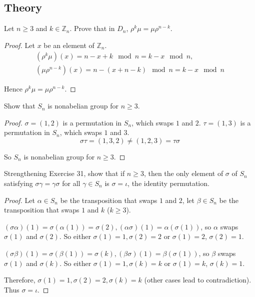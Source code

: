 \subsection*{Theory}

\newpage
\begin{exercise}
    Let $n\geq 3$ and $k\in\mathbb{Z}_{n}$. Prove that in $D_{n}$, $\rho^{k}\mu = \mu\rho^{n-k}$.
\end{exercise}

\begin{proof}
    Let $x$ be an element of $\mathbb{Z}_{n}$.
    \[
        \begin{split}
            (\rho^{k}\mu)(x) = n - x + k \mod n = k - x\mod n, \\
            (\mu\rho^{n-k})(x) = n - (x + n - k) \mod n = k - x \mod n
        \end{split}
    \]

    Hence $\rho^{k}\mu = \mu\rho^{n-k}$.
\end{proof}

\newpage
\begin{exercise}
    Show that $S_{n}$ is nonabelian group for $n\geq 3$.
\end{exercise}

\begin{proof}
    $\sigma = (1, 2)$ is a permutation in $S_{n}$, which swaps $1$ and $2$. $\tau = (1, 3)$ is a permutation in $S_{n}$, which swaps $1$ and $3$.
    \[
        \sigma\tau = (1, 3, 2) \ne (1, 2, 3) = \tau\sigma
    \]

    So $S_{n}$ is nonabelian group for $n\geq 3$.
\end{proof}

\newpage
\begin{exercise}
    Strengthening Exercise 31, show that if $n\geq 3$, then the only element of $\sigma$ of $S_{n}$ satisfying $\sigma\gamma = \gamma\sigma$ for all $\gamma\in S_{n}$ is $\sigma = \iota$, the identity permutation.
\end{exercise}

\begin{proof}
    Let $\alpha\in S_{n}$ be the transposition that swaps $1$ and $2$, let $\beta\in S_{n}$ be the transposition that swaps $1$ and $k$ ($k\geq 3$).

    $(\sigma\alpha)(1) = \sigma(\alpha(1)) = \sigma(2), (\alpha\sigma)(1) = \alpha(\sigma(1))$, so $\alpha$ swaps $\sigma(1)$ and $\sigma(2)$. So either $\sigma(1) = 1, \sigma(2) = 2$ or $\sigma(1) = 2$, $\sigma(2) = 1$.

    $(\sigma\beta)(1) = \sigma(\beta(1)) = \sigma(k), (\beta\sigma)(1) = \beta(\sigma(1))$, so $\beta$ swaps $\sigma(1)$ and $\sigma(k)$. So either $\sigma(1) = 1, \sigma(k) = k$ or $\sigma(1) = k$, $\sigma(k) = 1$.

    Therefore, $\sigma(1) = 1, \sigma(2) = 2, \sigma(k) = k$ (other cases lead to contradiction). Thus $\sigma = \iota$.
\end{proof}

